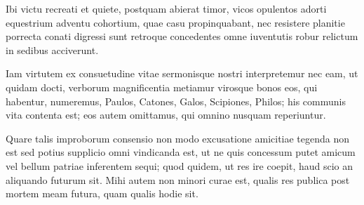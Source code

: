 Ibi victu recreati et quiete, postquam abierat timor, vicos opulentos adorti equestrium adventu cohortium, quae casu propinquabant, nec resistere planitie porrecta conati digressi sunt retroque concedentes omne iuventutis robur relictum in sedibus acciverunt.

Iam virtutem ex consuetudine vitae sermonisque nostri interpretemur nec eam, ut quidam docti, verborum magnificentia metiamur virosque bonos eos, qui habentur, numeremus, Paulos, Catones, Galos, Scipiones, Philos; his communis vita contenta est; eos autem omittamus, qui omnino nusquam reperiuntur.

Quare talis improborum consensio non modo excusatione amicitiae tegenda non est sed potius supplicio omni vindicanda est, ut ne quis concessum putet amicum vel bellum patriae inferentem sequi; quod quidem, ut res ire coepit, haud scio an aliquando futurum sit. Mihi autem non minori curae est, qualis res publica post mortem meam futura, quam qualis hodie sit.
